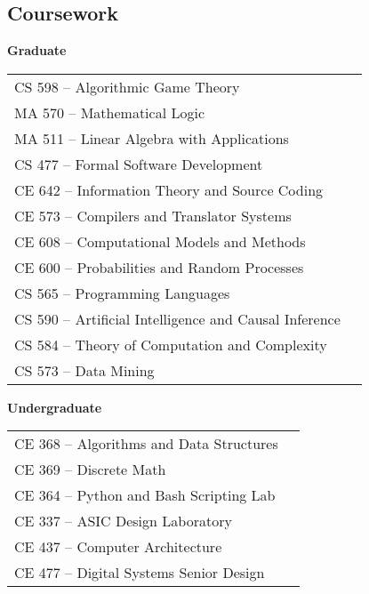 \documentclass[12pt,a4paper,sans]{moderncv}        %
\begin{document}
\subsection{Coursework}
\begin{minipage}[t]{0.45\linewidth}
  \raggedright
  \textbf{Graduate}
  \begin{tabular}{ll}
    CS 598 -- Algorithmic Game Theory \\
    MA 570 -- Mathematical Logic \\
    MA 511 -- Linear Algebra with Applications \\
    CS 477 -- Formal Software Development \\
    CE 642 -- Information Theory and Source Coding \\
    CE 573 -- Compilers and Translator Systems \\
    CE 608 -- Computational Models and Methods \\
    CE 600 -- Probabilities and Random Processes \\
    CS 565 -- Programming Languages \\
    CS 590 -- Artificial Intelligence and Causal Inference \\
    CS 584 -- Theory of Computation and Complexity \\
    CS 573 -- Data Mining \\
  \end{tabular}
\end{minipage}
\hfill
\begin{minipage}[t]{0.45\linewidth}
  \raggedright
  \textbf{Undergraduate}
  \begin{tabular}{ll}
    CE 368 -- Algorithms and Data Structures \\
    CE 369 -- Discrete Math \\
    CE 364 -- Python and Bash Scripting Lab \\
    CE 337 -- ASIC Design Laboratory \\
    CE 437 -- Computer Architecture \\
    CE 477 -- Digital Systems Senior Design \\
  \end{tabular}
\end{minipage}
\end{document}
